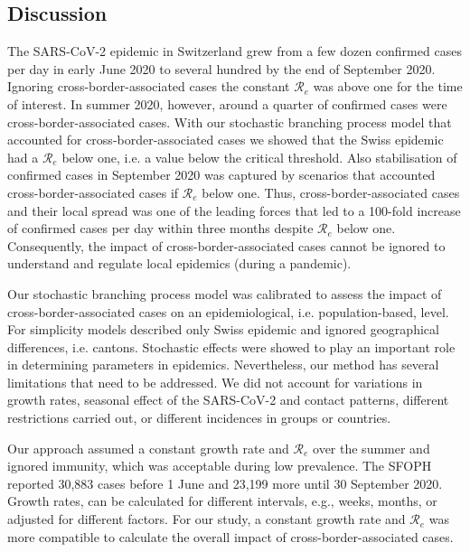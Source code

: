 \documentclass[10pt, a4paper, twoside]{article}
\begin{document}
\begin{multicols}{2}
\section{Discussion}
The SARS-CoV-2 epidemic in Switzerland grew from a few dozen confirmed cases per day in early June 2020 to several hundred by the end of September 2020.
Ignoring cross-border-associated cases the constant $\mathcal{R}_e$ was above one for the time of interest.
In summer 2020, however, around a quarter of confirmed cases were cross-border-associated cases.
With our stochastic branching process model that accounted for cross-border-associated cases we showed that the Swiss epidemic had a $\mathcal{R}_e$ below one, i.e. a value below the critical threshold.
Also stabilisation of confirmed cases in September 2020 was captured by scenarios that accounted cross-border-associated cases if $\mathcal{R}_e$ below one.
Thus, cross-border-associated cases and their local spread was one of the leading forces that led to a 100-fold increase of confirmed cases per day within three months despite $\mathcal{R}_e$ below one.
Consequently, the impact of cross-border-associated cases cannot be ignored to understand and regulate local epidemics (during a pandemic).
\break
\par
Our stochastic branching process model was calibrated to assess the impact of cross-border-associated cases on an epidemiological, i.e. population-based, level.
For simplicity models described only Swiss epidemic and ignored geographical differences, i.e. cantons.
Stochastic effects were showed to play an important role in determining parameters in epidemics.\cite{althaus_ebola_2015,riou_pattern_2020}
Nevertheless, our method has several limitations that need to be addressed.
We did not account for variations in growth rates, seasonal effect of the SARS-CoV-2 and contact patterns, different restrictions carried out, or different incidences in groups or countries.

Our approach assumed a constant growth rate and $\mathcal{R}_e$ over the summer and ignored immunity, which was acceptable during low prevalence.
The SFOPH reported 30,883 cases before 1 June and 23,199 more until 30 September 2020.
Growth rates, can be calculated for different intervals, e.g., weeks, months, or adjusted for different factors.
For our study, a constant growth rate and $\mathcal{R}_e$ was more compatible to calculate the overall impact of cross-border-associated cases.


\end{multicols}
\end{document}

